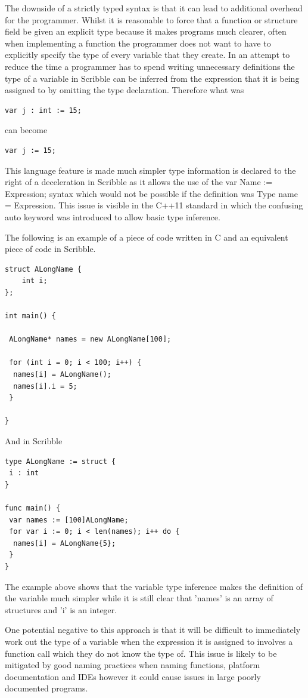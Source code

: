 \documentclass[]{final_report}
\begin{document}
The downside of a strictly typed syntax is that it can lead to additional overhead for the programmer. Whilst it is reasonable to force that a function or structure field be given an explicit type because it makes programs much clearer, often when implementing a function the programmer does not want to have to explicitly specify the type of every variable that they create. In an attempt to reduce the time a programmer has to spend writing unnecessary definitions the type of a variable in Scribble can be inferred from the expression that it is being assigned to by omitting the type declaration. Therefore what was 
\begin{verbatim}
var j : int := 15;
\end{verbatim}
can become \begin{verbatim}
var j := 15;
\end{verbatim}

This language feature is made much simpler type information is declared to the right of a deceleration in Scribble as it allows the use of the var Name := Expression; syntax which would not be possible if the definition was Type name = Expression. This issue is visible in the C++11 standard in which the confusing auto keyword was introduced to allow basic type inference.

The following is an example of a piece of code written in C and an equivalent piece of code in Scribble.

\begin{verbatim}
struct ALongName {
	int i;
};

int main() {

 ALongName* names = new ALongName[100];
 
 for (int i = 0; i < 100; i++) {
  names[i] = ALongName();
  names[i].i = 5;
 }

}
\end{verbatim}
And in Scribble
\begin{verbatim}
type ALongName := struct {
 i : int
}

func main() {
 var names := [100]ALongName;
 for var i := 0; i < len(names); i++ do {
  names[i] = ALongName{5};
 }
}
\end{verbatim}

The example above shows that the variable type inference makes the definition of the variable much simpler while it is still clear that 'names' is an array of structures and 'i' is an integer.

One potential negative to this approach is that it will be difficult to immediately work out the type of a variable when the expression it is assigned to involves a function call which they do not know the type of. This issue is likely to be mitigated by good naming practices when naming functions, platform documentation and IDEs however it could cause issues in large poorly documented programs.
\end{document}
